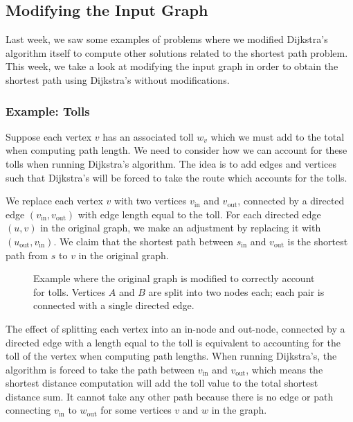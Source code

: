 \documentclass[11pt]{article}
\begin{document}
\subsection{Modifying the Input Graph}
Last week, we saw some examples of problems where we modified Dijkstra's algorithm itself to compute other solutions related to the shortest path problem. This week, we take a look at modifying the input graph in order to obtain the shortest path using Dijkstra's without modifications. 

\subsubsection{Example: Tolls}
Suppose each vertex $v$ has an associated toll $w_v$ which we must add to the total when computing path length. We need to consider how we can account for these tolls when running Dijkstra's algorithm. The idea is to add edges and vertices such that Dijkstra's will be forced to take the route which accounts for the tolls.

We replace each vertex $v$ with two vertices $v_\text{in}$ and $v_\text{out}$, connected by a directed edge $(v_\text{in}, v_\text{out})$ with edge length equal to the toll. For each directed edge $(u, v)$ in the original graph, we make an adjustment by replacing it with $(u_\text{out}, v_\text{in})$. We claim that the shortest path between $s_\text{in}$ and $v_\text{out}$ is the shortest path from $s$ to $v$ in the original graph. 

\begin{figure}[H]
    \begin{center}
        
    \end{center}
    \caption{Example where the original graph is modified to correctly account for tolls. Vertices $A$ and $B$ are split into two nodes each; each pair is connected with a single directed edge. }
\end{figure}

The effect of splitting each vertex into an in-node and out-node, connected by a directed edge with a length equal to the toll is equivalent to accounting for the toll of the vertex when computing path lengths. When running Dijkstra's, the algorithm is forced to take the path between $v_\text{in}$ and $v_\text{out}$, which means the shortest distance computation will add the toll value to the total shortest distance sum. It cannot take any other path because there is no edge or path connecting $v_\text{in}$ to $w_\text{out}$ for some vertices $v$ and $w$ in the graph. 
\end{document}

